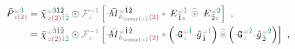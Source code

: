 \begin{subequations} \label{eq:DP^(2)-3_12-spectrum-G}
\begin{align}
	\Xint{\mathcolor{gray}{-}}{30}{\bar{P}}^{\;\! \mathcolor{gray}{\omega} \textcolor{PineGreen}{\hat{3}} }_{\;\! \mathcolor{gray}{z} \textcolor{Maroon}{(2)} } &= \bar{\chi}^{\;\! \mathcolor{gray}{\omega} \textcolor{PineGreen}{\hat{3}} \hat{1} \hat{2} }_{\;\! \mathcolor{gray}{z} \textcolor{Maroon}{(2)} \textcolor{PineGreen}{\hat{1} \hat{2}}} \odot \mathcolor{gray}{\mathcal F_{z}^{-1}} \left[ \Xint{\mathcolor{gray}{-}}{18}{\bar{M}}^{\;\! \mathcolor{gray}{\omega} \hat{1} \hat{2} }_{\;\! \mathcolor{gray}{k_{\symup{z}}} \textcolor{Maroon}{(2)} } \mathcolor{gray}{*} \Xint{\mathcolor{gray}{-}}{295}{E}^{\;\! \mathcolor{gray}{\omega} \textcolor{PineGreen}{\hat{1}}}_{\;\! \hat{1} \mathcolor{gray}{z}} ~\mathcolor{gray}{\widetilde \circledast}~ \Xint{\mathcolor{gray}{-}}{295}{E}^{\;\! \mathcolor{gray}{\omega} \textcolor{PineGreen}{\hat{2}}}_{\;\! \hat{2} \mathcolor{gray}{z}} \right] ~, \label{eq:DP^(2)-3_12-spectrum-G1} \\
	&= \bar{\chi}^{\;\! \mathcolor{gray}{\omega} \textcolor{PineGreen}{\hat{3}} \hat{1} \hat{2} }_{\;\! \mathcolor{gray}{z} \textcolor{Maroon}{(2)} \textcolor{PineGreen}{\hat{1} \hat{2}}} \odot \mathcolor{gray}{\mathcal F_{z}^{-1}} \left[ \Xint{\mathcolor{gray}{-}}{18}{\bar{M}}^{\;\! \mathcolor{gray}{\omega} \hat{1} \hat{2} }_{\;\! \mathcolor{gray}{k_{\symup{z}}} \textcolor{Maroon}{(2)} } \mathcolor{gray}{*} \left( \Xint{\mathcolor{gray}{-}}{20}{\mathtt{G}}^{\;\! \mathcolor{gray}{\omega} \textcolor{PineGreen}{\hat{1}}}_{\;\! \mathcolor{gray}{z}} \Xint{{}^{}_{\mathcolor{gray}{-}}}{10}{\hat{g}}^{\;\! \mathcolor{gray}{\omega} \textcolor{PineGreen}{\hat{1}}}_{\;\! \hat{1}} \right) \mathcolor{gray}{\widetilde \circledast} \left( \Xint{\mathcolor{gray}{-}}{20}{\mathtt{G}}^{\;\! \mathcolor{gray}{\omega} \textcolor{PineGreen}{\hat{2}}}_{\;\! \mathcolor{gray}{z}} \Xint{{}^{}_{\mathcolor{gray}{-}}}{10}{\hat{g}}^{\;\! \mathcolor{gray}{\omega} \textcolor{PineGreen}{\hat{2}}}_{\;\! \hat{2}} \right) \right] ~, \label{eq:DP^(2)-3_12-spectrum-G2}
\end{align}
\end{subequations}
